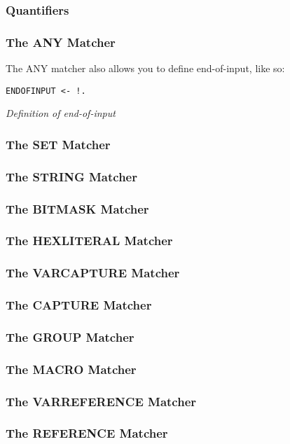 \subsubsection{Quantifiers}

\subsubsection{The ANY Matcher}

The ANY matcher also allows you to define end-of-input, like so:

\begin{myquote}
\begin{verbatim}
ENDOFINPUT <- !.
\end{verbatim}
\end{myquote}
\textit{Definition of end-of-input}

\subsubsection{The SET Matcher}

\subsubsection{The STRING Matcher}

\subsubsection{The BITMASK Matcher}

\subsubsection{The HEXLITERAL Matcher}

\subsubsection{The VARCAPTURE Matcher}

\subsubsection{The CAPTURE Matcher}

\subsubsection{The GROUP Matcher}

\subsubsection{The MACRO Matcher}

\subsubsection{The VARREFERENCE Matcher}

\subsubsection{The REFERENCE Matcher}

